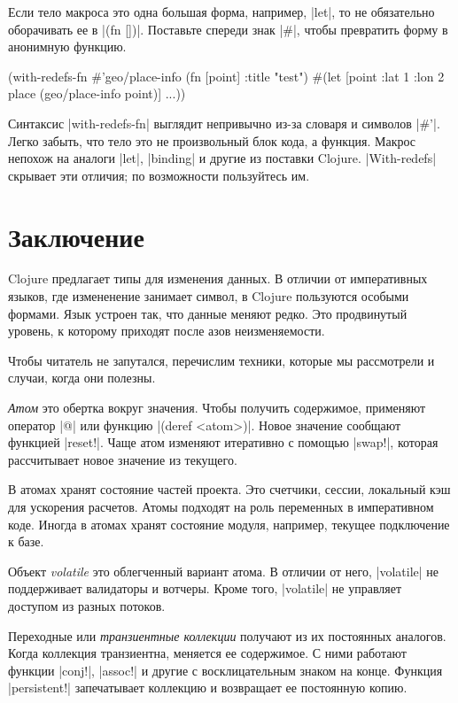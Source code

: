 Если тело макроса это одна большая форма, например, \spverb|let|, то не
обязательно оборачивать ее в \spverb|(fn [])|. Поставьте спереди знак
\spverb|#|, чтобы превратить форму в анонимную функцию.

\begin{english}
  \begin{clojure}
(with-redefs-fn
  {#'geo/place-info (fn [point] {:title "test"})}
  #(let [point {:lat 1 :lon 2}
         place (geo/place-info point)]
     ...))
  \end{clojure}
\end{english}

Синтаксис \spverb|with-redefs-fn| выглядит непривычно из-за словаря и символов
\spverb|#'|. Легко забыть, что тело это не произвольный блок кода, а
функция. Макрос непохож на аналоги \spverb|let|, \spverb|binding| и другие из
поставки Clojure. \spverb|With-redefs| скрывает эти отличия; по возможности
пользуйтесь им.

\section{Заключение}

Clojure предлагает типы для изменения данных. В отличии от императивных языков,
где измененение занимает символ, в Clojure пользуются особыми формами. Язык
устроен так, что данные меняют редко. Это продвинутый уровень, к которому
приходят после азов неизменяемости.

Чтобы читатель не запутался, перечислим техники, которые мы рассмотрели и
случаи, когда они полезны.

\emph{Атом} это обертка вокруг значения. Чтобы получить содержимое, применяют
оператор \spverb|@| или функцию \spverb|(deref <atom>)|. Новое значение сообщают
функцией \spverb|reset!|. Чаще атом изменяют итеративно с помощью
\spverb|swap!|, которая рассчитывает новое значение из текущего.

В атомах хранят состояние частей проекта. Это счетчики, сессии, локальный кэш
для ускорения расчетов. Атомы подходят на роль переменных в императивном
коде. Иногда в атомах хранят состояние модуля, например, текущее подключение к
базе.

Объект \emph{volatile} это облегченный вариант атома. В отличии от него,
\spverb|volatile| не поддерживает валидаторы и вотчеры. Кроме того,
\spverb|volatile| не управляет доступом из разных потоков.

Переходные или \emph{транзиентные коллекции} получают из их постоянных
аналогов. Когда коллекция транзиентна, меняется ее содержимое. С ними работают
функции \spverb|conj!|, \spverb|assoc!| и другие с восклицательным знаком на
конце. Функция \spverb|persistent!| запечатывает коллекцию и возвращает ее
постоянную копию.

